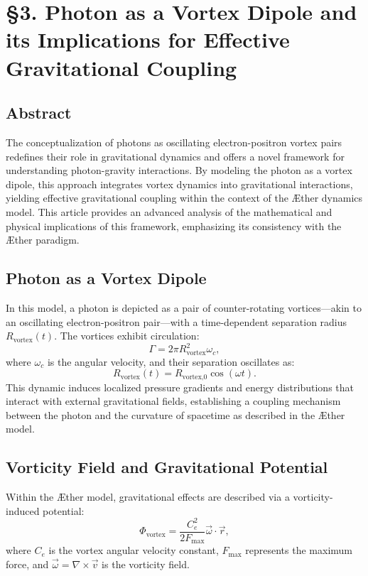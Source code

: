 

    \section*{§3. Photon as a Vortex Dipole and its Implications for Effective Gravitational Coupling}

    \subsection*{Abstract}
    The conceptualization of photons as oscillating electron-positron vortex pairs redefines their role in gravitational dynamics and offers a novel framework for understanding photon-gravity interactions. By modeling the photon as a vortex dipole, this approach integrates vortex dynamics into gravitational interactions, yielding effective gravitational coupling within the context of the Æther dynamics model. This article provides an advanced analysis of the mathematical and physical implications of this framework, emphasizing its consistency with the Æther paradigm.

    \subsection*{Photon as a Vortex Dipole}
    In this model, a photon is depicted as a pair of counter-rotating vortices—akin to an oscillating electron-positron pair—with a time-dependent separation radius $R_\text{vortex}(t)$. The vortices exhibit circulation:
    \begin{equation}
        \Gamma = 2 \pi R_\text{vortex}^2 \omega_c,
    \end{equation}
    where $\omega_c$ is the angular velocity, and their separation oscillates as:
    \begin{equation}
        R_\text{vortex}(t) = R_\text{vortex,0} \cos(\omega t).
    \end{equation}
    This dynamic induces localized pressure gradients and energy distributions that interact with external gravitational fields, establishing a coupling mechanism between the photon and the curvature of spacetime as described in the Æther model.

    \subsection*{Vorticity Field and Gravitational Potential}
    Within the Æther model, gravitational effects are described via a vorticity-induced potential:
    \begin{equation}
        \Phi_{\text{vortex}} = \frac{C_e^2}{2 F_{\text{max}}} \vec{\omega} \cdot \vec{r},
    \end{equation}
    where $C_e$ is the vortex angular velocity constant, $F_{\text{max}}$ represents the maximum force, and $\vec{\omega} = \nabla \times \vec{v}$ is the vorticity field.

